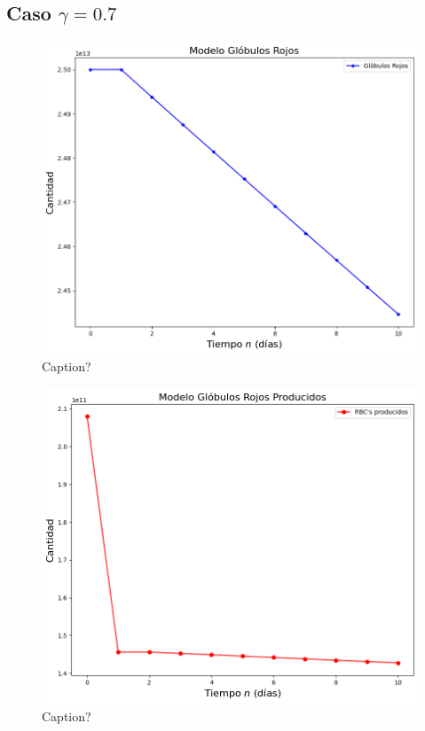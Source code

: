 \subsection{Caso $\gamma=0.7$}
\begin{figure}[H]
    \centering
    \includegraphics[scale=0.55]{figures/BaseG07RBC.png}
    \caption{Caption?}
    \label{sec:modelo:fig:G07RBC}
\end{figure}

\begin{figure}[H]
    \centering
    \includegraphics[scale=0.55]{figures/BaseG07SC.png}
    \caption{Caption?}
    \label{sec:modelo:fig:G07SC}
\end{figure}


